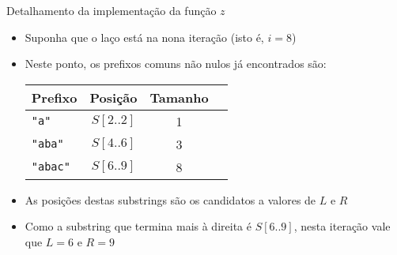 \begin{frame}[fragile]{Detalhamento da implementação da função $z$}

    \begin{itemize}
        \item Suponha que o laço  está na nona iteração (isto é, $i = 8$)

        \item Neste ponto, os prefixos comuns não nulos já encontrados são:

        \vspace{0.1in}
        \begin{center}
            \begin{tabularx}{0.7\textwidth}{Xccc}
            \toprule
            \textbf{Prefixo} & \textbf{Posição} & \textbf{Tamanho} \\
            \midrule
            \textcolor{red!80!black}{\verb|"a"|} & $S[2..2]$ & 1 \\
            \textcolor{red!80!black}{\verb|"aba"|} & $S[4..6]$ & 3 \\
            \textcolor{red!80!black}{\verb|"abac"|} & $S[6..9]$ & 8 \\
            \bottomrule
            \end{tabularx}
        \end{center}
        \vspace{0.1in}

        \item As posições destas substrings são os candidatos a valores de $L$ e $R$

        \item Como a substring que termina mais à direita é $S[6..9]$, nesta iteração vale que
            $L = 6$ e $R = 9$
    \end{itemize}

\end{frame}

